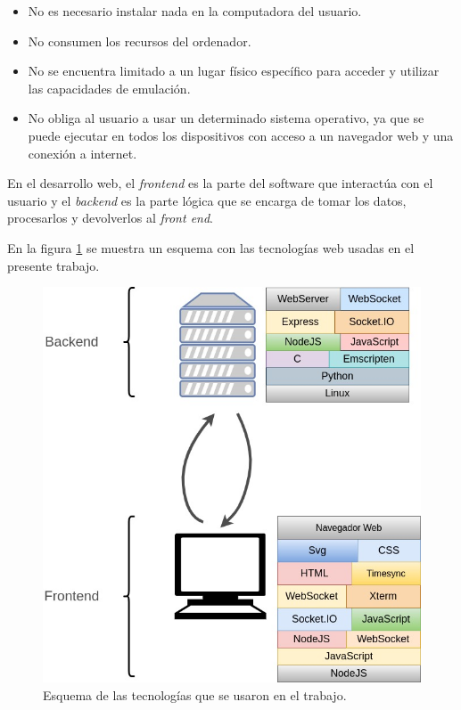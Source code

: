 \begin{itemize}
	\item No es necesario instalar nada en la computadora del usuario.
	\item No consumen los recursos del ordenador.
	\item No se encuentra limitado a un lugar físico específico para acceder y utilizar las capacidades de emulación.
	\item No obliga al usuario a usar un determinado sistema operativo, ya que se puede ejecutar en todos los dispositivos con acceso a un navegador web y una conexión a internet.
\end{itemize}

En el desarrollo web, el \textit{frontend} es la parte del software que interactúa con el usuario y el \textit{backend} es la parte lógica que se encarga de tomar los datos, procesarlos y devolverlos al \textit{front end}.

En la figura \ref{fig:frontBack} se muestra un esquema con las tecnologías
web usadas en el presente trabajo.

\begin{figure}[ht]
	\centering
	\includegraphics[scale=.57]{./Figures/FrontendBackend.jpg}
	\caption{Esquema de las tecnologías que se usaron en el trabajo.}
	\label{fig:frontBack}
\end{figure}


